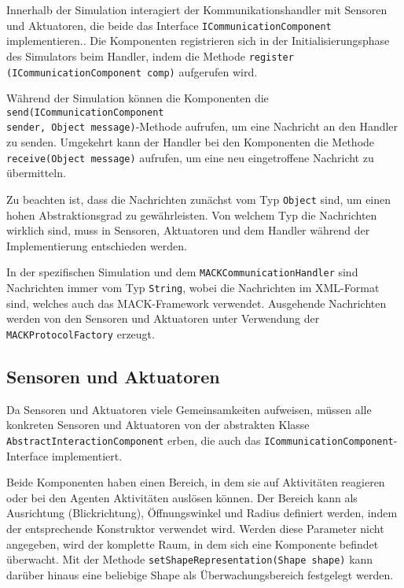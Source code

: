 Innerhalb der Simulation interagiert der Kommunikationshandler mit Sensoren und Aktuatoren, die beide das Interface \texttt{ICommunicationComponent} implementieren.. Die Komponenten registrieren sich in der Initialisierungsphase des Simulators beim Handler, indem die Methode \texttt{re\-gister (ICommunication\-Component comp)} aufgerufen wird.

Während der Simulation können die Komponenten die \texttt{send(ICommunication\-Component\\
sender, Object message)}-Methode aufrufen, um eine Nachricht an den Handler zu senden. Umgekehrt kann der Handler bei den Komponenten die Methode \texttt{receive(Object message)} aufrufen, um eine neu eingetroffene Nachricht zu übermitteln.

Zu beachten ist, dass die Nachrichten zunächst vom Typ \texttt{Object} sind, um einen hohen Abstraktionsgrad zu gewährleisten. Von welchem Typ die Nachrichten wirklich sind, muss in Sensoren, Aktuatoren und dem Handler während der Implementierung entschieden werden.

In der spezifischen Simulation und dem \texttt{MACKCommunicationHandler} sind Nachrichten immer vom Typ \texttt{String}, wobei die Nachrichten im XML-Format sind, welches auch das MACK-Framework verwendet. Ausgehende Nachrichten werden von den Sensoren und Aktuatoren unter Verwendung der \texttt{MACKProtocolFactory} erzeugt.


\subsection{Sensoren und Aktuatoren}\label{subsec:concept_actuators_sensors}
Da Sensoren und Aktuatoren viele Gemeinsamkeiten aufweisen, müssen alle konkreten Sensoren und Aktuatoren von der abstrakten Klasse \texttt{AbstractInteractionComponent} erben, die auch das \texttt{ICommunication\-Component}-Interface implementiert.

Beide Komponenten haben einen Bereich, in dem sie auf Aktivitäten reagieren oder bei den Agenten Aktivitäten auslösen können. Der Bereich kann als Ausrichtung (Blickrichtung), Öffnungswinkel und Radius definiert werden, indem der entsprechende Konstruktor verwendet wird. Werden diese Parameter nicht angegeben, wird der komplette Raum, in dem sich eine Komponente befindet überwacht. Mit der Methode \texttt{setShapeRepresentation(Shape shape)} kann darüber hinaus eine beliebige Shape als Überwachungsbereich festgelegt werden.

